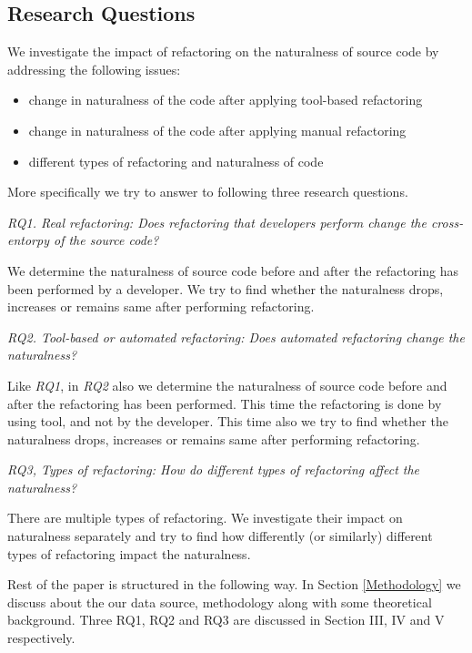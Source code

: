 \documentclass[conference]{IEEEtran}
\begin{document}
\subsection{Research Questions}
We investigate the impact of refactoring on the naturalness of source code by addressing the following issues:
\begin{itemize}
\item change in naturalness of the code after applying tool-based refactoring
\item change in naturalness of the code after applying manual refactoring
\item different types of refactoring and naturalness of code
\end{itemize}
More specifically we try to answer to following three research questions.

\textit{RQ1. Real refactoring: Does refactoring that developers perform change the cross-entorpy of the source code?}

We determine the naturalness of source code before and after the refactoring has been performed by a developer. We try to find whether the naturalness drops, increases or remains same after performing refactoring.

\textit{RQ2. Tool-based or automated refactoring: Does automated refactoring change the naturalness?}

Like \textit{RQ1}, in \textit{RQ2} also we determine the naturalness of source code before and after the refactoring has been performed. This time the refactoring is done by using tool, and not by the developer. This time also we try to find whether the naturalness drops, increases or remains same after performing refactoring.

\textit{RQ3, Types of refactoring: How do different types of refactoring affect the naturalness?}

There are multiple types of refactoring. We investigate their impact on naturalness separately and try to find how differently (or similarly) different types of refactoring impact the naturalness.

Rest of the paper is structured in the following way. In Section \ref{Methodology} we discuss about the our data source, methodology along with some theoretical background. Three RQ1, RQ2 and RQ3 are discussed in Section III, IV and V respectively. 

 
\end{document}
